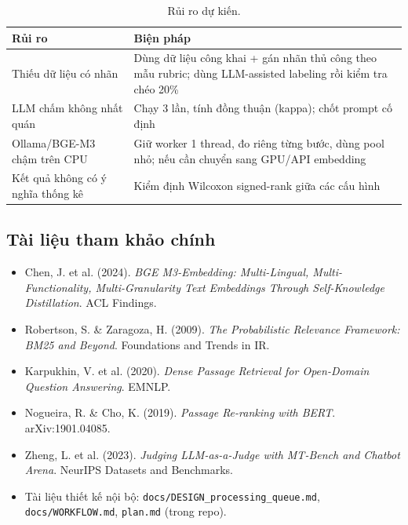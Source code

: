 \documentclass[a4paper,11pt]{article}
\begin{document}
\begin{table}[htbp]
\centering\small
\begin{tabular}{@{}lp{9.6cm}@{}}
\toprule
\textbf{Rủi ro} & \textbf{Biện pháp} \\
\midrule
Thiếu dữ liệu có nhãn & Dùng dữ liệu công khai + gán nhãn thủ công theo mẫu rubric; dùng
                       LLM-assisted labeling rồi kiểm tra chéo 20\% \\
LLM chấm không nhất quán & Chạy 3 lần, tính đồng thuận (kappa); chốt prompt cố định \\
Ollama/BGE-M3 chậm trên CPU & Giữ worker 1 thread, đo riêng từng bước, dùng pool nhỏ; nếu
                       cần chuyển sang GPU/API embedding \\
Kết quả không có ý nghĩa thống kê & Kiểm định Wilcoxon signed-rank giữa các cấu hình \\
\bottomrule
\end{tabular}
\caption{Rủi ro dự kiến.}
\label{tab:risk}
\end{table}

\subsection{Tài liệu tham khảo chính}

\begin{itemize}[leftmargin=1.2em, itemsep=2pt]
  \item Chen, J. et al. (2024). \emph{BGE M3-Embedding: Multi-Lingual, Multi-Functionality,
        Multi-Granularity Text Embeddings Through Self-Knowledge Distillation}. ACL Findings.
  \item Robertson, S. \& Zaragoza, H. (2009). \emph{The Probabilistic Relevance Framework:
        BM25 and Beyond}. Foundations and Trends in IR.
  \item Karpukhin, V. et al. (2020). \emph{Dense Passage Retrieval for Open-Domain Question
        Answering}. EMNLP.
  \item Nogueira, R. \& Cho, K. (2019). \emph{Passage Re-ranking with BERT}. arXiv:1901.04085.
  \item Zheng, L. et al. (2023). \emph{Judging LLM-as-a-Judge with MT-Bench and Chatbot Arena}.
        NeurIPS Datasets and Benchmarks.
  \item Tài liệu thiết kế nội bộ: \texttt{docs/DESIGN\_processing\_queue.md},
        \texttt{docs/WORKFLOW.md}, \texttt{plan.md} (trong repo).
\end{itemize}

\end{document}

